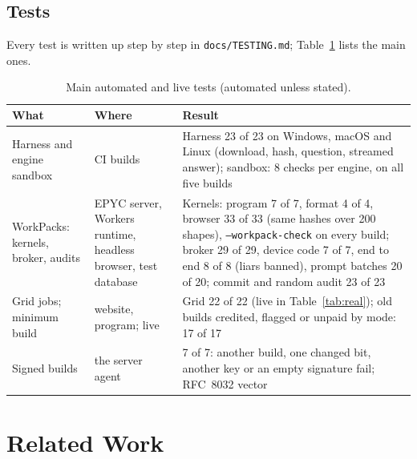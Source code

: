 \documentclass[11pt,a4paper]{article}
\theoremstyle{definition}
\theoremstyle{plain}
\begin{document}
\subsection{Tests}\label{sec:tests}

Every test is written up step by step in \texttt{docs/TESTING.md}; Table~\ref{tab:tests} lists the main ones.

\begin{table}[ht]
\centering
\caption{Main automated and live tests (automated unless stated).}\label{tab:tests}
\footnotesize
\begin{tabularx}{\linewidth}{@{}>{\raggedright\arraybackslash}p{3.0cm}>{\raggedright\arraybackslash}p{2.8cm}X@{}}
\toprule
\textbf{What} & \textbf{Where} & \textbf{Result} \\
\midrule
Harness and engine sandbox & CI builds & Harness 23 of 23 on Windows, macOS and Linux (download, hash, question, streamed answer); sandbox: 8 checks per engine, on all five builds \\
WorkPacks: kernels, broker, audits & EPYC server, Workers runtime, headless browser, test database & Kernels: program 7 of 7, format 4 of 4, browser 33 of 33 (same hashes over 200 shapes), \texttt{--workpack-check} on every build; broker 29 of 29, device code 7 of 7, end to end 8 of 8 (liars banned), prompt batches 20 of 20; commit and random audit 23 of 23 \\
Grid jobs; minimum build & website, program; live & Grid 22 of 22 (live in Table~\ref{tab:real}); old builds credited, flagged or unpaid by mode: 17 of 17 \\
Signed builds & the server agent & 7 of 7: another build, one changed bit, another key or an empty signature fail; RFC~8032 vector \\
\bottomrule
\end{tabularx}
\end{table}

\section{Related Work}\label{sec:related}
\end{document}
